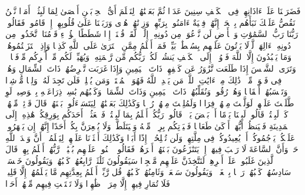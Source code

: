 \startbuffer[\q:18:11]
فَضَرَبۡنَا عَلَىٰۤ ءَاذَانِهِمۡ فِی ٱلۡكَهۡفِ سِنِینَ عَدَدࣰا%
\stopbuffer
\startbuffer[\q:18:12]
ثُمَّ بَعَثۡنَٰهُمۡ لِنَعۡلَمَ أَیُّ ٱلۡحِزۡبَیۡنِ أَحۡصَىٰ لِمَا لَبِثُوۤا۟ أَمَدࣰا%
\stopbuffer
\startbuffer[\q:18:13]
نَّحۡنُ نَقُصُّ عَلَیۡكَ نَبَأَهُم بِٱلۡحَقِّۚ إِنَّهُمۡ فِتۡیَةٌ ءَامَنُوا۟ بِرَبِّهِمۡ وَزِدۡنَٰهُمۡ هُدࣰى%
\stopbuffer
\startbuffer[\q:18:14]
وَرَبَطۡنَا عَلَىٰ قُلُوبِهِمۡ إِذۡ قَامُوا۟ فَقَالُوا۟ رَبُّنَا رَبُّ ٱلسَّمَٰوَٰتِ وَٱلۡأَرۡضِ لَن نَّدۡعُوَا۟ مِن دُونِهِۦۤ إِلَٰهࣰاۖ لَّقَدۡ قُلۡنَاۤ إِذࣰا شَطَطًا%
\stopbuffer
\startbuffer[\q:18:15]
هَٰۤؤُلَاۤءِ قَوۡمُنَا ٱتَّخَذُوا۟ مِن دُونِهِۦۤ ءَالِهَةࣰۖ لَّوۡلَا یَأۡتُونَ عَلَیۡهِم بِسُلۡطَٰنِۭ بَیِّنࣲۖ فَمَنۡ أَظۡلَمُ مِمَّنِ ٱفۡتَرَىٰ عَلَى ٱللَّهِ كَذِبࣰا%
\stopbuffer
\startbuffer[\q:18:16]
وَإِذِ ٱعۡتَزَلۡتُمُوهُمۡ وَمَا یَعۡبُدُونَ إِلَّا ٱللَّهَ فَأۡوُۥۤا۟ إِلَى ٱلۡكَهۡفِ یَنشُرۡ لَكُمۡ رَبُّكُم مِّن رَّحۡمَتِهِۦ وَیُهَیِّئۡ لَكُم مِّنۡ أَمۡرِكُم مِّرۡفَقࣰا%
\stopbuffer
\startbuffer[\q:18:17]
۞ وَتَرَى ٱلشَّمۡسَ إِذَا طَلَعَت تَّزَٰوَرُ عَن كَهۡفِهِمۡ ذَاتَ ٱلۡیَمِینِ وَإِذَا غَرَبَت تَّقۡرِضُهُمۡ ذَاتَ ٱلشِّمَالِ وَهُمۡ فِی فَجۡوَةࣲ مِّنۡهُۚ ذَٰلِكَ مِنۡ ءَایَٰتِ ٱللَّهِۗ مَن یَهۡدِ ٱللَّهُ فَهُوَ ٱلۡمُهۡتَدِۖ وَمَن یُضۡلِلۡ فَلَن تَجِدَ لَهُۥ وَلِیࣰّا مُّرۡشِدࣰا%
\stopbuffer
\startbuffer[\q:18:18]
وَتَحۡسَبُهُمۡ أَیۡقَاظࣰا وَهُمۡ رُقُودࣱۚ وَنُقَلِّبُهُمۡ ذَاتَ ٱلۡیَمِینِ وَذَاتَ ٱلشِّمَالِۖ وَكَلۡبُهُم بَٰسِطࣱ ذِرَاعَیۡهِ بِٱلۡوَصِیدِۚ لَوِ ٱطَّلَعۡتَ عَلَیۡهِمۡ لَوَلَّیۡتَ مِنۡهُمۡ فِرَارࣰا وَلَمُلِئۡتَ مِنۡهُمۡ رُعۡبࣰا%
\stopbuffer
\startbuffer[\q:18:19]
وَكَذَٰلِكَ بَعَثۡنَٰهُمۡ لِیَتَسَاۤءَلُوا۟ بَیۡنَهُمۡۚ قَالَ قَاۤئِلࣱ مِّنۡهُمۡ كَمۡ لَبِثۡتُمۡۖ قَالُوا۟ لَبِثۡنَا یَوۡمًا أَوۡ بَعۡضَ یَوۡمࣲۚ قَالُوا۟ رَبُّكُمۡ أَعۡلَمُ بِمَا لَبِثۡتُمۡ فَٱبۡعَثُوۤا۟ أَحَدَكُم بِوَرِقِكُمۡ هَٰذِهِۦۤ إِلَى ٱلۡمَدِینَةِ فَلۡیَنظُرۡ أَیُّهَاۤ أَزۡكَىٰ طَعَامࣰا فَلۡیَأۡتِكُم بِرِزۡقࣲ مِّنۡهُ وَلۡیَتَلَطَّفۡ وَلَا یُشۡعِرَنَّ بِكُمۡ أَحَدًا%
\stopbuffer
\startbuffer[\q:18:20]
إِنَّهُمۡ إِن یَظۡهَرُوا۟ عَلَیۡكُمۡ یَرۡجُمُوكُمۡ أَوۡ یُعِیدُوكُمۡ فِی مِلَّتِهِمۡ وَلَن تُفۡلِحُوۤا۟ إِذًا أَبَدࣰا%
\stopbuffer
\startbuffer[\q:18:21]
وَكَذَٰلِكَ أَعۡثَرۡنَا عَلَیۡهِمۡ لِیَعۡلَمُوۤا۟ أَنَّ وَعۡدَ ٱللَّهِ حَقࣱّ وَأَنَّ ٱلسَّاعَةَ لَا رَیۡبَ فِیهَاۤ إِذۡ یَتَنَٰزَعُونَ بَیۡنَهُمۡ أَمۡرَهُمۡۖ فَقَالُوا۟ ٱبۡنُوا۟ عَلَیۡهِم بُنۡیَٰنࣰاۖ رَّبُّهُمۡ أَعۡلَمُ بِهِمۡۚ قَالَ ٱلَّذِینَ غَلَبُوا۟ عَلَىٰۤ أَمۡرِهِمۡ لَنَتَّخِذَنَّ عَلَیۡهِم مَّسۡجِدࣰا%
\stopbuffer
\startbuffer[\q:18:22]
سَیَقُولُونَ ثَلَٰثَةࣱ رَّابِعُهُمۡ كَلۡبُهُمۡ وَیَقُولُونَ خَمۡسَةࣱ سَادِسُهُمۡ كَلۡبُهُمۡ رَجۡمَۢا بِٱلۡغَیۡبِۖ وَیَقُولُونَ سَبۡعَةࣱ وَثَامِنُهُمۡ كَلۡبُهُمۡۚ قُل رَّبِّیۤ أَعۡلَمُ بِعِدَّتِهِم مَّا یَعۡلَمُهُمۡ إِلَّا قَلِیلࣱۗ فَلَا تُمَارِ فِیهِمۡ إِلَّا مِرَاۤءࣰ ظَٰهِرࣰا وَلَا تَسۡتَفۡتِ فِیهِم مِّنۡهُمۡ أَحَدࣰا%
